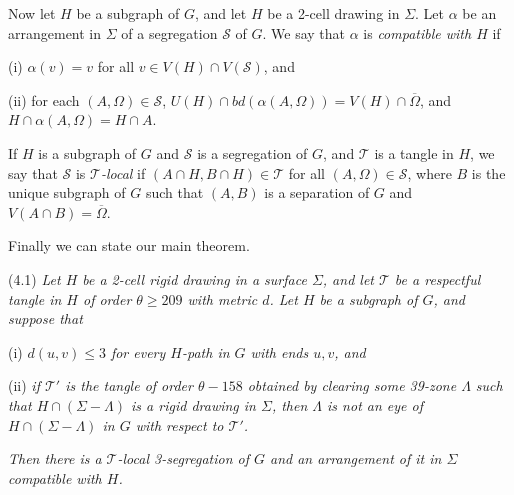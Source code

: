 Now let $H$ be a subgraph of $G$, and let $H$ be a 2-cell drawing in $\Sigma$. Let $\alpha$ be an arrangement in $\Sigma$ of a segregation $\mathscr{S}$ of $G$. We say that $\alpha$ is \textit{compatible with $H$} if

\hspace*{12pt}(i) $\alpha(v) = v$ for all $v \in V(H) \cap V(\mathscr{S})$, and

\hspace*{12pt}(ii) for each $(A, \Omega) \in \mathscr{S}$, $U(H) \cap bd(\alpha(A, \Omega)) = V(H) \cap \overline{\Omega}$, and $H \cap \alpha(A, \Omega) = H \cap A$.

If $H$ is a subgraph of $G$ and $\mathscr{S}$ is a segregation of $G$, and $\mathscr{T}$ is a tangle in $H$, we say that $\mathscr{S}$ is \textit{$\mathscr{T}$-local} if $(A \cap H, B \cap H) \in \mathscr{T}$ for all $(A, \Omega) \in \mathscr{S}$, where $B$ is the unique subgraph of $G$ such that $(A, B)$ is a separation of $G$ and $V(A \cap B) = \overline{\Omega}$.

Finally we can state our main theorem.

\stmt
(4.1) \textit{Let $H$ be a 2-cell rigid drawing in a surface $\Sigma$, and let $\mathscr{T}$ be a respectful tangle in $H$ of order $\theta \ge 209$ with metric $d$. Let $H$ be a subgraph of $G$, and suppose that}

\hspace*{12pt}(i) \textit{$d(u, v) \le 3$ for every $H$-path in $G$ with ends $u, v$, and}

\hspace*{12pt}(ii) \textit{if $\mathscr{T}'$ is the tangle of order $\theta - 158$ obtained by clearing some 39-zone $\Lambda$ such that $H \cap (\Sigma - \Lambda)$ is a rigid drawing in $\Sigma$, then $\Lambda$ is not an eye of $H \cap (\Sigma - \Lambda)$ in $G$ with respect to $\mathscr{T}'$.}

\textit{Then there is a $\mathscr{T}$-local 3-segregation of $G$ and an arrangement of it in $\Sigma$ compatible with $H$.}

